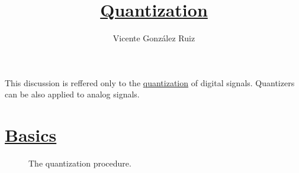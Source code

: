 
\title{\href{https://github.com/vicente-gonzalez-ruiz/quantization}{Quantization}}

\author{Vicente González Ruiz}

\maketitle

This discussion is reffered only to the
\href{https://en.wikipedia.org/wiki/Quantization_(signal_processing)}{quantization}
of digital signals. Quantizers can be also applied to analog signals.

\section{\href{https://en.wikipedia.org/wiki/Quantization\_(signal\_processing)}{Basics}}

\begin{figure}
  \caption{The quantization procedure.}
  \label{fig:cuantif}
\end{figure}

